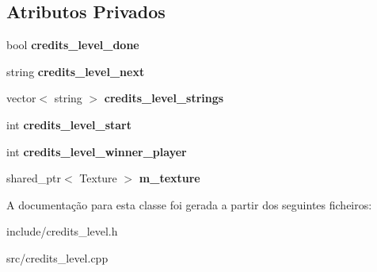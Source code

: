 \subsection*{Atributos Privados}
\begin{DoxyCompactItemize}
\item 
\mbox{\label{classCreditsLevel_a2b7dd48d2e3def60499d4f6143b61923}} 
bool {\bfseries credits\+\_\+level\+\_\+done}
\item 
\mbox{\label{classCreditsLevel_a4203423c76e8ba68f943f39d2f0d05c7}} 
string {\bfseries credits\+\_\+level\+\_\+next}
\item 
\mbox{\label{classCreditsLevel_a90e3043e37443cb6f2c7841ac4ae5525}} 
vector$<$ string $>$ {\bfseries credits\+\_\+level\+\_\+strings}
\item 
\mbox{\label{classCreditsLevel_ab7ac1647d977be5650daee20614bdede}} 
int {\bfseries credits\+\_\+level\+\_\+start}
\item 
\mbox{\label{classCreditsLevel_a7bbf616f51bff1fedbbc06d2b068b974}} 
int {\bfseries credits\+\_\+level\+\_\+winner\+\_\+player}
\item 
\mbox{\label{classCreditsLevel_a27faf20ac97534bd328a2c8a017ca5ea}} 
shared\+\_\+ptr$<$ Texture $>$ {\bfseries m\+\_\+texture}
\end{DoxyCompactItemize}


A documentação para esta classe foi gerada a partir dos seguintes ficheiros\+:\begin{DoxyCompactItemize}
\item 
include/credits\+\_\+level.\+h\item 
src/credits\+\_\+level.\+cpp\end{DoxyCompactItemize}

